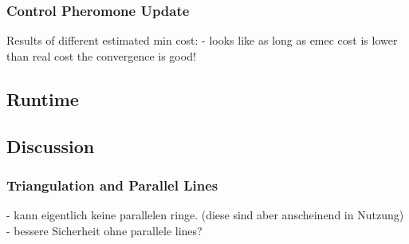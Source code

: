 

\subsubsection{Control Pheromone Update}\label{pheromone_update}

Results of different estimated min cost:
	- looks like as long as emec cost is lower than real cost the convergence is good!

\subsection{Runtime}
\subsection{Discussion}\label{sec:discussion}
\subsubsection{Triangulation and Parallel Lines}
	- kann eigentlich keine parallelen ringe. (diese sind aber anscheinend in Nutzung)
	- bessere Sicherheit ohne parallele lines?